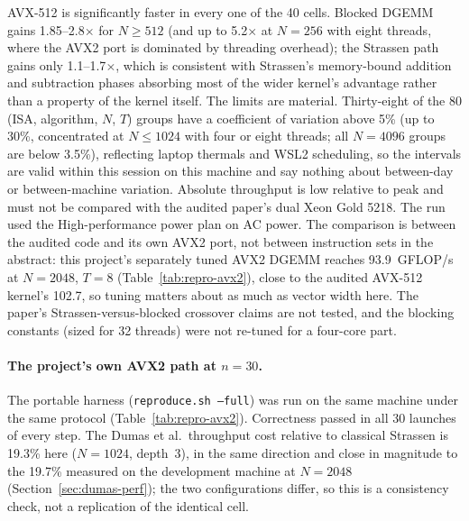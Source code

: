 \documentclass[acmsmall]{acmart}
\begin{document}
AVX-512 is significantly faster in every one of the 40 cells. Blocked
DGEMM gains 1.85--2.8$\times$ for $N\ge512$ (and up to 5.2$\times$ at
$N{=}256$ with eight threads, where the AVX2 port is dominated by
threading overhead); the Strassen path gains only 1.1--1.7$\times$, which is
consistent with Strassen's memory-bound addition and subtraction phases
absorbing most of the wider kernel's advantage rather than a property
of the kernel itself. The limits are material. Thirty-eight of the 80
(ISA, algorithm, $N$, $T$) groups have a coefficient of variation above
5\% (up to 30\%, concentrated at $N\le1024$ with four or eight threads;
all $N{=}4096$ groups are below 3.5\%), reflecting laptop thermals and
WSL2 scheduling, so the
intervals are valid within this session on this machine and say nothing
about between-day or between-machine variation. Absolute throughput is
low relative to peak and must not be compared with the audited paper's
dual Xeon Gold 5218. The run used the High-performance power plan on AC
power. The comparison is between the audited code and its own AVX2 port,
not between instruction sets in the abstract: this project's separately
tuned AVX2 DGEMM reaches 93.9~GFLOP/s at $N{=}2048$, $T{=}8$
(Table~\ref{tab:repro-avx2}), close to the audited AVX-512 kernel's
102.7, so tuning matters about as much as vector width here. The paper's
Strassen-versus-blocked crossover claims are not tested, and the blocking
constants (sized for 32 threads) were not re-tuned for a four-core part.

\paragraph{The project's own AVX2 path at $n{=}30$.}
The portable harness (\texttt{reproduce.sh --full}) was run on the same
machine under the same protocol (Table~\ref{tab:repro-avx2}). Correctness
passed in all 30 launches of every step. The Dumas et al.\ throughput cost
relative to classical Strassen is 19.3\% here ($N{=}1024$, depth~3), in
the same direction and close in magnitude to the 19.7\% measured on the
development machine at $N{=}2048$ (Section~\ref{sec:dumas-perf}); the
two configurations differ, so this is a consistency check, not a
replication of the identical cell.
\end{document}
